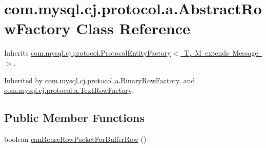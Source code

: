 \hypertarget{classcom_1_1mysql_1_1cj_1_1protocol_1_1a_1_1_abstract_row_factory}{}\section{com.\+mysql.\+cj.\+protocol.\+a.\+Abstract\+Row\+Factory Class Reference}
\label{classcom_1_1mysql_1_1cj_1_1protocol_1_1a_1_1_abstract_row_factory}


Inherits \mbox{\hyperlink{interfacecom_1_1mysql_1_1cj_1_1protocol_1_1_protocol_entity_factory}{com.\+mysql.\+cj.\+protocol.\+Protocol\+Entity\+Factory$<$ T, M extends Message $>$}}.



Inherited by \mbox{\hyperlink{classcom_1_1mysql_1_1cj_1_1protocol_1_1a_1_1_binary_row_factory}{com.\+mysql.\+cj.\+protocol.\+a.\+Binary\+Row\+Factory}}, and \mbox{\hyperlink{classcom_1_1mysql_1_1cj_1_1protocol_1_1a_1_1_text_row_factory}{com.\+mysql.\+cj.\+protocol.\+a.\+Text\+Row\+Factory}}.

\subsection*{Public Member Functions}
\begin{DoxyCompactItemize}
\item 
boolean \mbox{\hyperlink{classcom_1_1mysql_1_1cj_1_1protocol_1_1a_1_1_abstract_row_factory_a4692c57d253b16f586b8c201c6109ab0}{can\+Reuse\+Row\+Packet\+For\+Buffer\+Row}} ()
\end{DoxyCompactItemize}
